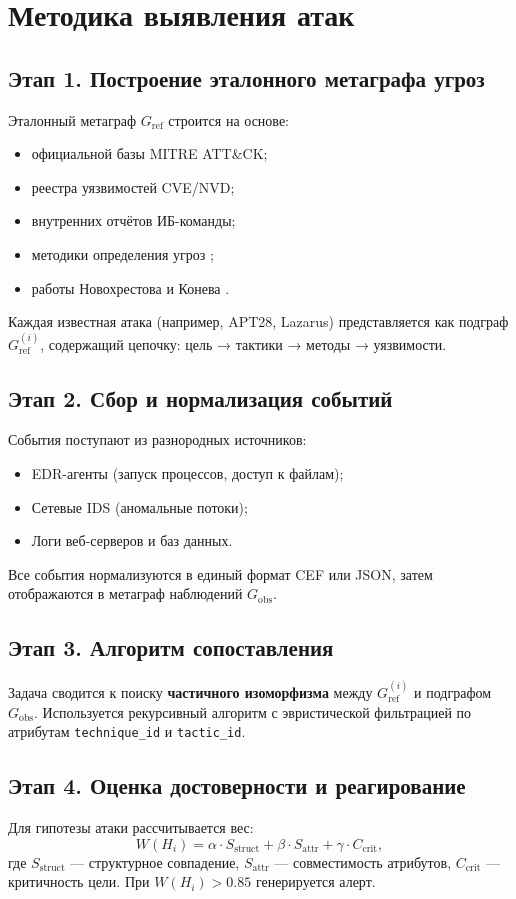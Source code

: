 \section{Методика выявления атак}

\subsection{Этап 1. Построение эталонного метаграфа угроз}

Эталонный метаграф \(G_{\text{ref}}\) строится на основе:
\begin{itemize}
    \item официальной базы MITRE ATT\&CK;
    \item реестра уязвимостей CVE/NVD;
    \item внутренних отчётов ИБ-команды;
    \item методики определения угроз \cite{fsteck2015threats};
    \item работы Новохрестова и Конева \cite{novokhrestov2014security}.
\end{itemize}

Каждая известная атака (например, APT28, Lazarus) представляется как подграф \(G_{\text{ref}}^{(i)}\), содержащий цепочку: цель → тактики → методы → уязвимости.

\subsection{Этап 2. Сбор и нормализация событий}

События поступают из разнородных источников:
\begin{itemize}
    \item EDR-агенты (запуск процессов, доступ к файлам);
    \item Сетевые IDS (аномальные потоки);
    \item Логи веб-серверов и баз данных.
\end{itemize}

Все события нормализуются в единый формат CEF или JSON, затем отображаются в метаграф наблюдений \(G_{\text{obs}}\).

\subsection{Этап 3. Алгоритм сопоставления}

Задача сводится к поиску \textbf{частичного изоморфизма} между \(G_{\text{ref}}^{(i)}\) и подграфом \(G_{\text{obs}}\). Используется рекурсивный алгоритм с эвристической фильтрацией по атрибутам \texttt{technique\_id} и \texttt{tactic\_id}.

\subsection{Этап 4. Оценка достоверности и реагирование}

Для гипотезы атаки рассчитывается вес:
\[
W(H_i) = \alpha \cdot S_{\text{struct}} + \beta \cdot S_{\text{attr}} + \gamma \cdot C_{\text{crit}},
\]
где \(S_{\text{struct}}\) — структурное совпадение, \(S_{\text{attr}}\) — совместимость атрибутов, \(C_{\text{crit}}\) — критичность цели. При \(W(H_i) > 0.85\) генерируется алерт.